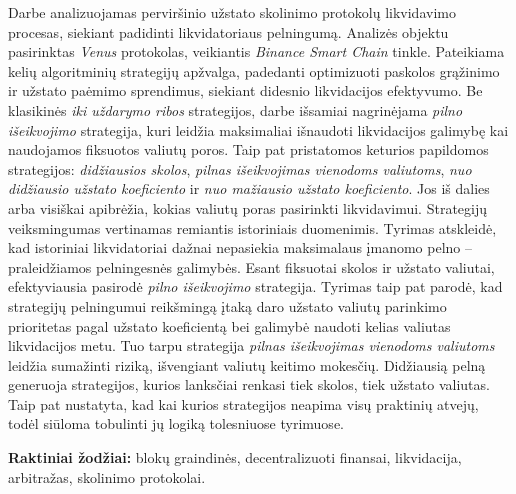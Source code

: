 \documentclass[]{VUMIFTemplateClass}
\begin{document}

\singlespacing


\tableofcontents

\onehalfspacing

Darbe analizuojamas perviršinio užstato skolinimo protokolų likvidavimo procesas, siekiant padidinti likvidatoriaus pelningumą. Analizės objektu pasirinktas \textit{Venus} protokolas, veikiantis \textit{Binance Smart Chain} tinkle. Pateikiama kelių algoritminių strategijų apžvalga, padedanti optimizuoti paskolos grąžinimo ir užstato paėmimo sprendimus, siekiant didesnio likvidacijos efektyvumo. Be klasikinės \textit{iki uždarymo ribos} strategijos, darbe išsamiai nagrinėjama \textit{pilno išeikvojimo} strategija, kuri leidžia maksimaliai išnaudoti likvidacijos galimybę kai naudojamos fiksuotos valiutų poros. Taip pat pristatomos keturios papildomos strategijos: \textit{didžiausios skolos}, \textit{pilnas išeikvojimas vienodoms valiutoms}, \textit{nuo didžiausio užstato koeficiento} ir \textit{nuo mažiausio užstato koeficiento}. Jos iš dalies arba visiškai apibrėžia, kokias valiutų poras pasirinkti likvidavimui. Strategijų veiksmingumas vertinamas remiantis istoriniais duomenimis.
Tyrimas atskleidė, kad istoriniai likvidatoriai dažnai nepasiekia maksimalaus įmanomo pelno – praleidžiamos pelningesnės galimybės. Esant fiksuotai skolos ir užstato valiutai, efektyviausia pasirodė \textit{pilno išeikvojimo} strategija. Tyrimas taip pat parodė, kad strategijų pelningumui reikšmingą įtaką daro užstato valiutų parinkimo prioritetas pagal užstato koeficientą bei galimybė naudoti kelias valiutas likvidacijos metu. Tuo tarpu strategija \textit{pilnas išeikvojimas vienodoms valiutoms} leidžia sumažinti riziką, išvengiant valiutų keitimo mokesčių. Didžiausią pelną generuoja strategijos, kurios lanksčiai renkasi tiek skolos, tiek užstato valiutas. Taip pat nustatyta, kad kai kurios strategijos neapima visų praktinių atvejų, todėl siūloma tobulinti jų logiką tolesniuose tyrimuose.

\noindent\textbf{Raktiniai žodžiai:} blokų graindinės, decentralizuoti finansai, likvidacija, arbitražas,  skolinimo protokolai.
\end{document}
